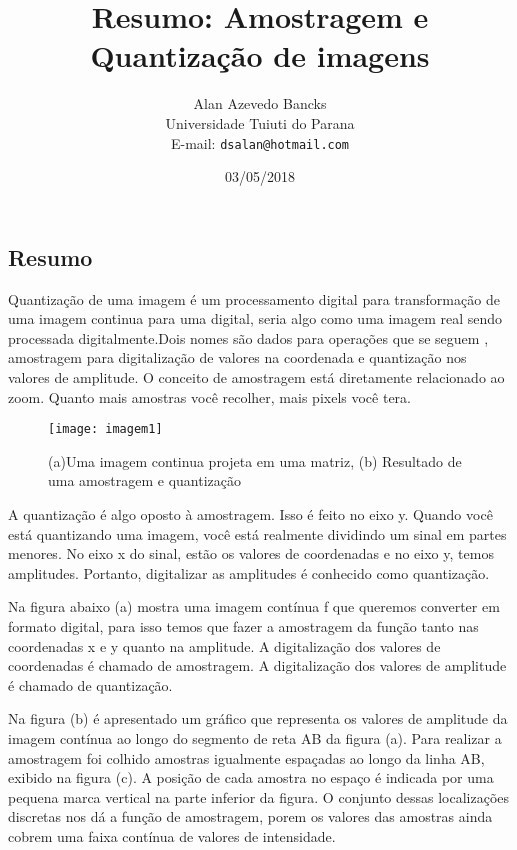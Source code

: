 \documentclass[a4paper,11pt]{article}
\title{Resumo: Amostragem e Quantização de imagens}
\author{Alan Azevedo Bancks \\ Universidade Tuiuti do Parana \\E-mail: {\tt dsalan@hotmail.com}}
\date{03/05/2018}
\begin{document}
\maketitle


\begin{multicols}{2}
\section{Resumo}
Quantização de uma imagem é um processamento digital para transformação de uma imagem continua para uma digital, seria algo como uma imagem real sendo processada digitalmente.Dois nomes são dados para operações que se seguem , amostragem para digitalização de valores na coordenada e quantização nos valores de amplitude.
O conceito de amostragem está diretamente relacionado ao zoom. Quanto mais amostras você recolher, mais pixels você tera.



\begin{figure}[H]
	\centering
	\texttt{[image: imagem1]}
	\caption{ (a)Uma imagem continua projeta em uma matriz, (b) Resultado de uma amostragem e quantização}
	\label{fig:nonfloat}
\end{figure}

A quantização é algo oposto à amostragem. Isso é feito no eixo y. Quando você está quantizando uma imagem, você está realmente dividindo um sinal em partes menores.
No eixo x do sinal, estão os valores de coordenadas e no eixo y, temos amplitudes. Portanto, digitalizar as amplitudes é conhecido como quantização.


Na figura abaixo (a) mostra uma imagem contínua f que queremos converter em formato digital, para isso temos que fazer a amostragem da função tanto nas coordenadas x e y quanto na amplitude. A digitalização dos valores de coordenadas é chamado de amostragem. A digitalização dos valores de amplitude é chamado de quantização.



Na figura (b) é apresentado um gráfico que representa os valores de amplitude da imagem contínua ao longo do segmento de reta AB da figura (a). Para realizar a amostragem foi colhido amostras igualmente espaçadas ao longo da linha AB, exibido na figura (c). A posição de cada amostra no espaço é indicada por uma pequena marca vertical na parte inferior da figura. O conjunto dessas localizações discretas nos dá a função de amostragem, porem os valores das amostras ainda cobrem uma faixa contínua de valores de intensidade.


\end{multicols}
\end{document}
